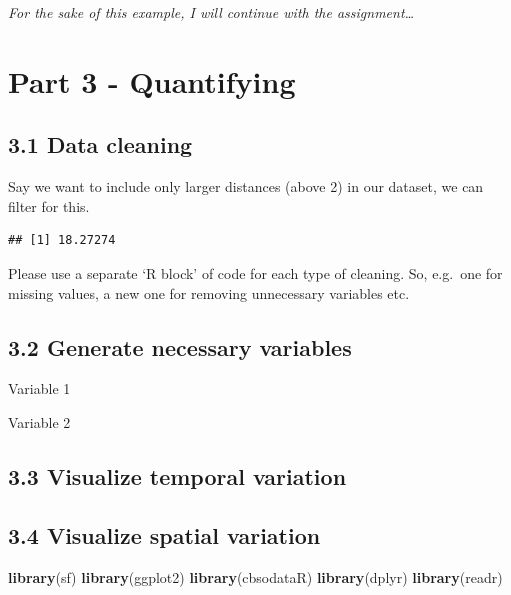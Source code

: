 \documentclass[
]{article}
\newenvironment{Shaded}{\begin{snugshade}}{\end{snugshade}}
\newcommand{\FunctionTok}[1]{\textcolor[rgb]{0.13,0.29,0.53}{\textbf{#1}}}
\newcommand{\NormalTok}[1]{#1}
\newcommand{\SpecialCharTok}[1]{\textcolor[rgb]{0.81,0.36,0.00}{\textbf{#1}}}
\begin{document}
\emph{For the sake of this example, I will continue with the
assignment\ldots{}}

\section{Part 3 - Quantifying}\label{part-3---quantifying}

\subsection{3.1 Data cleaning}\label{data-cleaning}

Say we want to include only larger distances (above 2) in our dataset,
we can filter for this.

\begin{Shaded}
\end{Shaded}

\begin{verbatim}
## [1] 18.27274
\end{verbatim}

Please use a separate `R block' of code for each type of cleaning. So,
e.g.~one for missing values, a new one for removing unnecessary
variables etc.

\subsection{3.2 Generate necessary
variables}\label{generate-necessary-variables}

Variable 1

Variable 2

\subsection{3.3 Visualize temporal
variation}\label{visualize-temporal-variation}

\subsection{3.4 Visualize spatial
variation}\label{visualize-spatial-variation}

\begin{Shaded}
\begin{Highlighting}[]
\FunctionTok{library}\NormalTok{(sf)}
\FunctionTok{library}\NormalTok{(ggplot2)}
\FunctionTok{library}\NormalTok{(cbsodataR)}
\FunctionTok{library}\NormalTok{(dplyr)       }
\FunctionTok{library}\NormalTok{(readr)}
\end{Highlighting}
\end{Shaded}
\end{document}
